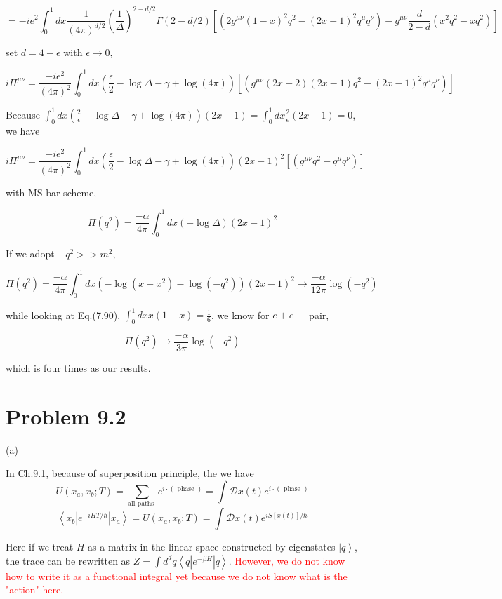 \documentclass[prd,aps,nofootinbib,floatfix,10pt]{revtex4}
\newcommand{\red}{\textcolor{red}}
\begin{document}
\[ = -i e^2 \int_0^1 dx \frac{1}{(4\pi)^{d/2}} (\frac{1}{\Delta})^{2-d/2} \Gamma(2-d/2) [ (2 g^{\mu \nu} (1-x)^2 q^2 - (2x-1)^2 q^\mu q^\nu) - g^{\mu \nu} \frac{d}{2-d} (x^2 q^2 - x q^2) ] \]

set $d = 4-\epsilon$ with $\epsilon \to 0$,

\[ i \Pi^{\mu \nu} = \frac{-i e^2}{(4\pi)^{2}} \int_0^1 dx  (\frac{\epsilon}{2} -\log\Delta - \gamma + \log(4\pi)) [ (g^{\mu \nu} (2x-2)(2x-1) q^2 - (2x-1)^2 q^\mu q^\nu) ] \]

Because $\int_0^1 dx  (\frac{2}{\epsilon} -\log\Delta - \gamma + \log(4\pi)) (2x-1) = \int_0^1 dx  \frac{2}{\epsilon} (2x-1) = 0$, we have

\[ i \Pi^{\mu \nu} = \frac{-i e^2}{(4\pi)^{2}} \int_0^1 dx  (\frac{\epsilon}{2} -\log\Delta - \gamma + \log(4\pi)) (2x-1)^2 [ (g^{\mu \nu} q^2 - q^\mu q^\nu) ] \]

with MS-bar scheme,

\[ \Pi(q^2) = \frac{-\alpha}{4\pi} \int_0^1 dx  (-\log\Delta ) (2x-1)^2 \]

If we adopt $-q^2 >> m^2$, 

\[ \Pi(q^2) = \frac{-\alpha}{4\pi} \int_0^1 dx  (-\log(x - x^2) - \log(-q^2) ) (2x-1)^2  \to \frac{-\alpha}{12 \pi} \log(-q^2)\]

while looking at Eq.(7.90), $\int_0^1 dx x(1-x) = \frac{1}{6}$, we know for $e+e-$ pair,

\[ \Pi(q^2) \to \frac{-\alpha}{3 \pi} \log(-q^2) \]

which is four times as our results.


\section{Problem 9.2}

\noindent (a)

In Ch.9.1, because of superposition principle, the  we have 
\[ U\left(x_{a}, x_{b} ; T\right)=\sum_{\text {all paths }} e^{i \cdot(\text { phase })}=\int \mathcal{D} x(t) e^{i \cdot(\text { phase })} \]
\[ \left\langle x_{b}\left|e^{-i H T / \hbar}\right| x_{a}\right\rangle=U\left(x_{a}, x_{b} ; T\right)=\int \mathcal{D} x(t) e^{i S[x(t)] / \hbar} \]

Here if we treat $H$ as a matrix in the linear space constructed by eigenstates $\left. | q \right\rangle$, the trace can be rewritten as $Z = \int d^d q \left\langle q | e^{-\beta H} | q \right\rangle$. \red{However, we do not know how to write it as a functional integral yet because we do not know what is the "action" here.}
\end{document}
